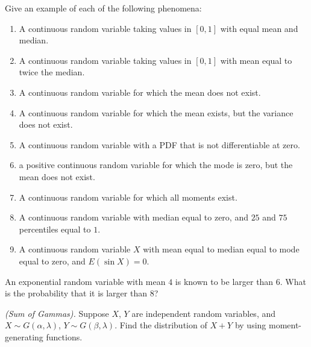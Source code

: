 \begin{problem}[Handout 13, \# 16]
  Give an example of each of the following phenomena:
  \begin{enumerate}[label=(\alph*),noitemsep]
  \item A continuous random variable taking values in \([0,1]\) with equal
    mean and median.
  \item A continuous random variable taking values in \([0,1]\) with mean
    equal to twice the median.
  \item A continuous random variable for which the mean does not exist.
  \item A continuous random variable for which the mean exists, but the
    variance does not exist.
  \item A continuous random variable with a PDF that is not differentiable
    at zero.
  \item a positive continuous random variable for which the mode is zero,
    but the mean does not exist.
  \item A continuous random variable for which all moments exist.
  \item A continuous random variable with median equal to zero, and
    \(25\) and \(75\) percentiles equal to \(1\).
  \item A continuous random variable \(X\) with mean equal to median equal
    to mode equal to zero, and \(E(\sin X)=0\).
  \end{enumerate}
\end{problem}
\begin{solution}

\end{solution}
\newpage

\begin{problem}[Handout 13, \# 17]
  An exponential random variable with mean \(4\) is known to be larger than
  \(6\). What is the probability that it is larger than \(8\)?
\end{problem}
\begin{solution}

\end{solution}
\newpage

\begin{problem}[Handout 13, \# 18]
  \emph{(Sum of Gammas).} Suppose \(X\), \(Y\) are independent random
  variables, and \(X\sim G(\alpha,\lambda)\), \(Y\sim
  G(\beta,\lambda)\). Find the distribution of \(X+Y\) by using
  moment-generating functions.
\end{problem}
\begin{solution}

\end{solution}
\newpage

